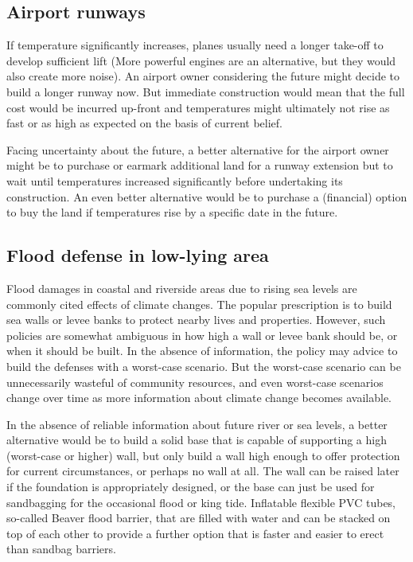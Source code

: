 \documentclass[11pt,letter]{article}
\theoremstyle{definition}
\theoremstyle{remark}
\numberwithin{equation}{section}
\begin{document}
\subsection{Airport runways}
If temperature significantly increases, planes usually need a longer take-off to develop sufficient lift (More powerful engines are an alternative, but they would also create more noise). An airport owner considering the future might decide to build a longer runway now. But immediate construction would mean that the full cost would be incurred up-front and temperatures might ultimately not rise as fast or as high as expected on the basis of current belief. 
 
Facing uncertainty about the future, a better alternative for the airport owner might be to purchase or earmark additional land for a runway extension but to wait until temperatures increased significantly before undertaking its construction.  An even better alternative would be to purchase a (financial) option to buy the land if temperatures rise by a specific date in the future. 

\subsection{Flood defense in low-lying area}
Flood damages in coastal and riverside areas due to rising sea levels are commonly cited effects of climate changes. The popular prescription is to build sea walls or levee banks to protect nearby lives and properties. However, such policies are somewhat ambiguous in how high a wall or levee bank should be, or when it should be built. In the absence of information, the policy may advice to build the defenses with a worst-case scenario. But the worst-case scenario can be unnecessarily wasteful of community resources, and even worst-case scenarios change over time as more information about climate change becomes available. 
 
In the absence of reliable information about future river or sea levels, a better alternative would be to build a solid base that is capable of supporting a high (worst-case or higher) wall, but only build a wall high enough to offer protection for current circumstances, or perhaps no wall at all.  The wall can be raised later if the foundation is appropriately designed, or the base can just be used for sandbagging for the occasional flood or king tide.  Inflatable flexible PVC tubes, so-called Beaver flood barrier, that are filled with water and can be stacked on top of each other to provide a further option that is faster and easier to erect than sandbag barriers. 
 
\end{document}
